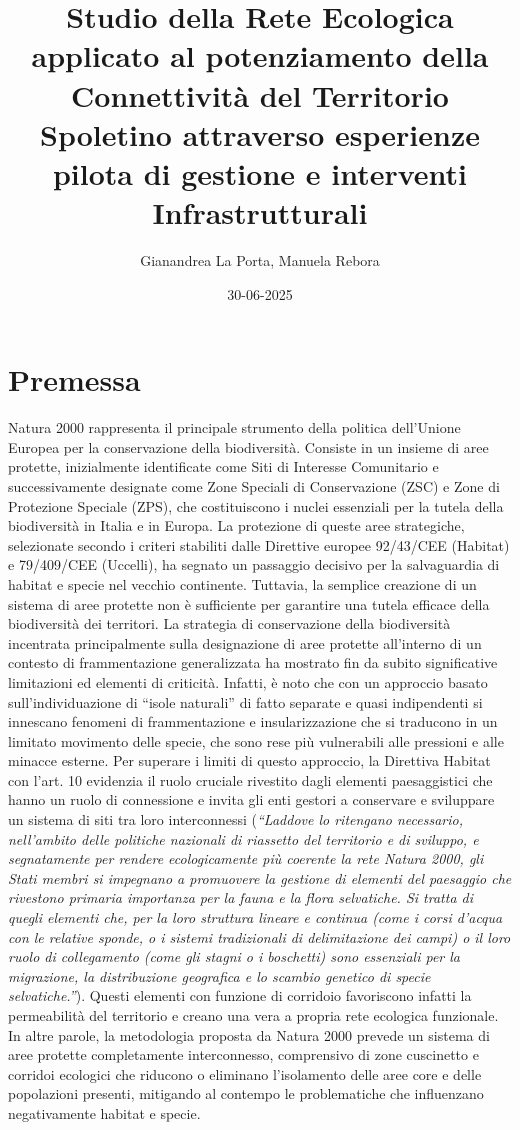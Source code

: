 \documentclass[
  a4paper,
]{book}
\title{Studio della Rete Ecologica applicato al potenziamento della Connettività del Territorio Spoletino attraverso esperienze pilota di gestione e interventi Infrastrutturali}
\author{Gianandrea La Porta, Manuela Rebora}
\date{30-06-2025}
\begin{document}
\maketitle

{
\setcounter{tocdepth}{1}
\tableofcontents
}
\chapter{Premessa}\label{premessa}

Natura 2000 rappresenta il principale strumento della politica dell'Unione Europea per la conservazione della biodiversità. Consiste in un insieme di aree protette, inizialmente identificate come Siti di Interesse Comunitario e successivamente designate come Zone Speciali di Conservazione (ZSC) e Zone di Protezione Speciale (ZPS), che costituiscono i nuclei essenziali per la tutela della biodiversità in Italia e in Europa. La protezione di queste aree strategiche, selezionate secondo i criteri stabiliti dalle Direttive europee 92/43/CEE (Habitat) e 79/409/CEE (Uccelli), ha segnato un passaggio decisivo per la salvaguardia di habitat e specie nel vecchio continente. Tuttavia, la semplice creazione di un sistema di aree protette non è sufficiente per garantire una tutela efficace della biodiversità dei territori. La strategia di conservazione della biodiversità incentrata principalmente sulla designazione di aree protette all'interno di un contesto di frammentazione generalizzata ha mostrato fin da subito significative limitazioni ed elementi di criticità. Infatti, è noto che con un approccio basato sull'individuazione di ``isole naturali'' di fatto separate e quasi indipendenti si innescano fenomeni di frammentazione e insularizzazione che si traducono in un limitato movimento delle specie, che sono rese più vulnerabili alle pressioni e alle minacce esterne. Per superare i limiti di questo approccio, la Direttiva Habitat con l'art. 10 evidenzia il ruolo cruciale rivestito dagli elementi paesaggistici che hanno un ruolo di connessione e invita gli enti gestori a conservare e sviluppare un sistema di siti tra loro interconnessi (\emph{``Laddove lo ritengano necessario, nell'ambito delle politiche nazionali di riassetto del territorio e di sviluppo, e segnatamente per rendere ecologicamente più coerente la rete Natura 2000, gli Stati membri si impegnano a promuovere la gestione di elementi del paesaggio che rivestono primaria importanza per la fauna e la flora selvatiche. Si tratta di quegli elementi che, per la loro struttura lineare e continua (come i corsi d'acqua con le relative sponde, o i sistemi tradizionali di delimitazione dei campi) o il loro ruolo di collegamento (come gli stagni o i boschetti) sono essenziali per la migrazione, la distribuzione geografica e lo scambio genetico di specie selvatiche.''}). Questi elementi con funzione di corridoio favoriscono infatti la permeabilità del territorio e creano una vera a propria rete ecologica funzionale. In altre parole, la metodologia proposta da Natura 2000 prevede un sistema di aree protette completamente interconnesso, comprensivo di zone cuscinetto e corridoi ecologici che riducono o eliminano l'isolamento delle aree core e delle popolazioni presenti, mitigando al contempo le problematiche che influenzano negativamente habitat e specie.
\end{document}
